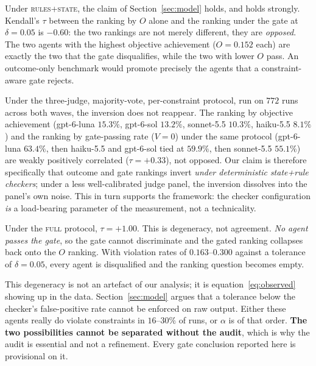 \documentclass{article}
\begin{document}
Under \textsc{rules+state}, the claim of Section~\ref{sec:model} holds, and holds strongly. Kendall's $\tau$ between the ranking by $O$ alone and the ranking under the gate at $\delta=0.05$ is $-0.60$: the two rankings are not merely different, they are \emph{opposed}. The two agents with the highest objective achievement ($O=0.152$ each) are exactly the two that the gate disqualifies, while the two with lower $O$ pass. An outcome-only benchmark would promote precisely the agents that a constraint-aware gate rejects.

Under the three-judge, majority-vote, per-constraint protocol, run on $772$ runs across both waves, the inversion does not reappear. The ranking by objective achievement (gpt-6-luna $15.3\%$, gpt-6-sol $13.2\%$, sonnet-5.5 $10.3\%$, haiku-5.5 $8.1\%$) and the ranking by gate-passing rate ($V{=}0$) under the same protocol (gpt-6-luna $63.4\%$, then haiku-5.5 and gpt-6-sol tied at $59.9\%$, then sonnet-5.5 $55.1\%$) are weakly positively correlated ($\tau=+0.33$), not opposed. Our claim is therefore specifically that outcome and gate rankings invert \emph{under deterministic state+rule checkers}; under a less well-calibrated judge panel, the inversion dissolves into the panel's own noise. This in turn supports the framework: the checker configuration \emph{is} a load-bearing parameter of the measurement, not a technicality.

Under the \textsc{full} protocol, $\tau=+1.00$. This is degeneracy, not agreement. \emph{No agent passes the gate}, so the gate cannot discriminate and the gated ranking collapses back onto the $O$ ranking. With violation rates of $0.163$--$0.300$ against a tolerance of $\delta=0.05$, every agent is disqualified and the ranking question becomes empty.

This degeneracy is not an artefact of our analysis; it is equation~\eqref{eq:observed} showing up in the data. Section~\ref{sec:model} argues that a tolerance below the checker's false-positive rate cannot be enforced on raw output. Either these agents really do violate constraints in $16$--$30\%$ of runs, or $\alpha$ is of that order. \textbf{The two possibilities cannot be separated without the audit}, which is why the audit is essential and not a refinement. Every gate conclusion reported here is provisional on it.
\end{document}
